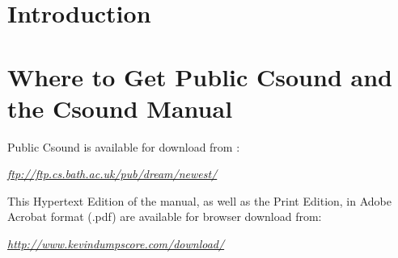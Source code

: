 \begin{comment}
\documentclass[10pt]{article}
\usepackage{fullpage, graphicx, url}
\setlength{\parskip}{1ex}
\setlength{\parindent}{0ex}
\title{Introduction}



\begin{tabular}{ccc}
The Alternative Csound Reference Manual & & \\
Previous & &Next

\end{tabular}

\end{comment}
\section{Introduction}
\section{Where to Get Public Csound and the Csound Manual}


  Public Csound is available for download from : 


  \emph{\url{ftp://ftp.cs.bath.ac.uk/pub/dream/newest/}}
 


  This Hypertext Edition of the manual, as well as the Print Edition, in Adobe Acrobat format (.pdf) are available for browser download from: 


  \emph{\url{http://www.kevindumpscore.com/download/}}
 


\begin{comment}
\begin{tabular}{lcr}
Previous &Home &Next \\
Overview &Up &How to Install Csound

\end{tabular}



\end{comment}
